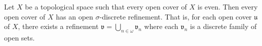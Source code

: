 Let $X$ be a topological space such that every open cover of $X$ is even. Then every open cover of $X$ has an open $\sigma$-discrete refinement. That is, for each open cover $\mathfrak{u}$ of $X$, there exists a refinement $\mathfrak{v} = \bigcup_{n \in \omega} \mathfrak{v}_n$ where each $\mathfrak{v}_n$ is a discrete family of open sets.
